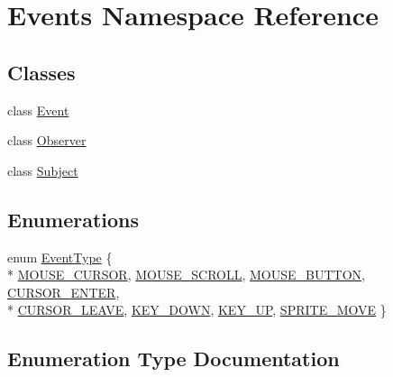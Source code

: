 \hypertarget{namespace_events}{}\section{Events Namespace Reference}
\label{namespace_events}
\subsection*{Classes}
\begin{DoxyCompactItemize}
\item 
class \hyperlink{class_events_1_1_event}{Event}
\item 
class \hyperlink{class_events_1_1_observer}{Observer}
\item 
class \hyperlink{class_events_1_1_subject}{Subject}
\end{DoxyCompactItemize}
\subsection*{Enumerations}
\begin{DoxyCompactItemize}
\item 
enum \hyperlink{namespace_events_a85b018e2484fb7e336c3bb03bd41816a}{Event\+Type} \{ \\*
\hyperlink{namespace_events_a85b018e2484fb7e336c3bb03bd41816aa0cb764fec5c8199714bf03253c59947d}{M\+O\+U\+S\+E\+\_\+\+C\+U\+R\+S\+O\+R}, 
\hyperlink{namespace_events_a85b018e2484fb7e336c3bb03bd41816aab140bcabe8209ca48d5819ea5eec1388}{M\+O\+U\+S\+E\+\_\+\+S\+C\+R\+O\+L\+L}, 
\hyperlink{namespace_events_a85b018e2484fb7e336c3bb03bd41816aac2d747dfb137a8b7718063fe7748b5f4}{M\+O\+U\+S\+E\+\_\+\+B\+U\+T\+T\+O\+N}, 
\hyperlink{namespace_events_a85b018e2484fb7e336c3bb03bd41816aa6c257ebeef1901158cdf7d14de99d707}{C\+U\+R\+S\+O\+R\+\_\+\+E\+N\+T\+E\+R}, 
\\*
\hyperlink{namespace_events_a85b018e2484fb7e336c3bb03bd41816aa485a5cc8bf22749daf99c3d3864a00f0}{C\+U\+R\+S\+O\+R\+\_\+\+L\+E\+A\+V\+E}, 
\hyperlink{namespace_events_a85b018e2484fb7e336c3bb03bd41816aabfd0602b97b7a8bfdf17ac0ce9906a5b}{K\+E\+Y\+\_\+\+D\+O\+W\+N}, 
\hyperlink{namespace_events_a85b018e2484fb7e336c3bb03bd41816aaf029df17599c60ec56183ab424c203f2}{K\+E\+Y\+\_\+\+U\+P}, 
\hyperlink{namespace_events_a85b018e2484fb7e336c3bb03bd41816aa757670ec7d6770630737a8203e475d43}{S\+P\+R\+I\+T\+E\+\_\+\+M\+O\+V\+E}
 \}
\end{DoxyCompactItemize}


\subsection{Enumeration Type Documentation}
\hypertarget{namespace_events_a85b018e2484fb7e336c3bb03bd41816a}{}
